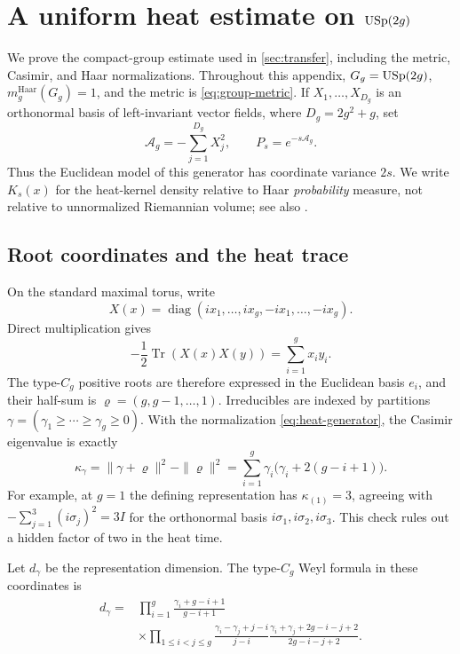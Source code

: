 \section{\texorpdfstring{A uniform heat estimate on \(\mathrm{USp}(2g)\)}%
  {A uniform heat estimate on USp(2g)}}
\label{app:heat-trace}

We prove the compact-group estimate used in \cref{sec:transfer}, including
the metric, Casimir, and Haar normalizations.  Throughout this appendix,
\(G_g=\mathrm{USp}(2g)\), \(m_g^{\mathrm{Haar}}(G_g)=1\), and the metric is
\eqref{eq:group-metric}.  If \(X_1,\ldots,X_{D_g}\) is an orthonormal basis
of left-invariant vector fields, where \(D_g=2g^2+g\), set
\begin{equation}
 \mathcal A_g=-\sum_{j=1}^{D_g}X_j^2,
 \qquad P_s=e^{-s\mathcal A_g}.
\label{eq:heat-generator}
\end{equation}
Thus the Euclidean model of this generator has coordinate variance \(2s\).
We write \(K_s(x)\) for the heat-kernel density relative to Haar
\emph{probability} measure, not relative to unnormalized Riemannian volume;
see also \cite{Hall1999}.

\subsection{Root coordinates and the heat trace}

On the standard maximal torus, write
\[
 X(x)=\operatorname{diag}(ix_1,\ldots,ix_g,-ix_1,\ldots,-ix_g).
\]
Direct multiplication gives
\begin{equation}
 -\frac12\operatorname{Tr}(X(x)X(y))=\sum_{i=1}^gx_iy_i.
\label{eq:torus-metric}
\end{equation}
The type-\(C_g\) positive roots are therefore expressed in the Euclidean
basis \(e_i\), and their half-sum is
\(\varrho=(g,g-1,\ldots,1)\).  Irreducibles are indexed by partitions
\(\gamma=(\gamma_1\ge\cdots\ge\gamma_g\ge0)\).  With the normalization
\eqref{eq:heat-generator}, the Casimir eigenvalue is exactly
\begin{equation}
 \kappa_\gamma
 =\|\gamma+\varrho\|^2-\|\varrho\|^2
 =\sum_{i=1}^g\gamma_i
       \bigl(\gamma_i+2(g-i+1)\bigr).
\label{eq:casimir}
\end{equation}
For example, at \(g=1\) the defining representation has
\(\kappa_{(1)}=3\), agreeing with
\(-\sum_{j=1}^3(i\sigma_j)^2=3I\) for the orthonormal basis
\(i\sigma_1,i\sigma_2,i\sigma_3\).  This check rules out a hidden factor of
two in the heat time.

Let \(d_\gamma\) be the representation dimension.  The type-\(C_g\) Weyl
formula in these coordinates is
\begin{equation}
\begin{split}
 d_\gamma={}&\prod_{i=1}^g
 \frac{\gamma_i+g-i+1}{g-i+1}\\
 &\times\prod_{1\le i<j\le g}
 \frac{\gamma_i-\gamma_j+j-i}{j-i}
 \frac{\gamma_i+\gamma_j+2g-i-j+2}{2g-i-j+2}.
\end{split}
\label{eq:weyl-dimension}
\end{equation}


